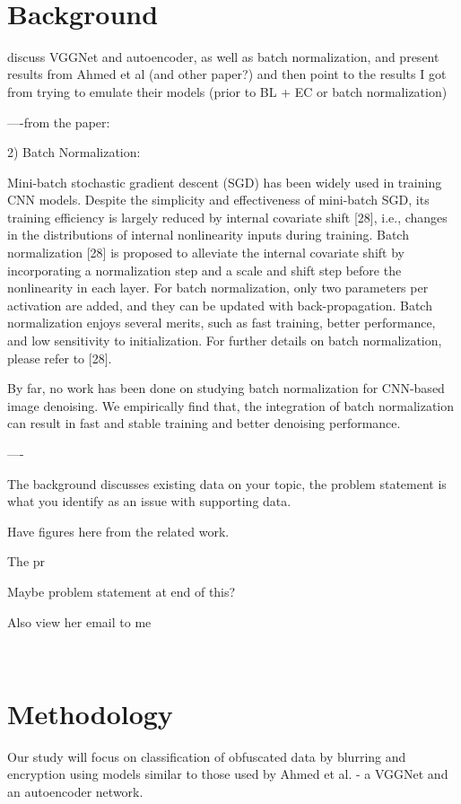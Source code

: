 \documentclass[12pt, titlepage]{article}
\begin{document}
~\newpage
\section{Background}\label{Background}

discuss VGGNet and autoencoder, as well as batch normalization, and present results from Ahmed et al (and other paper?) and then point to the results I got from trying to emulate their models (prior to BL + EC or batch normalization)

----from the paper:


2) Batch Normalization:

Mini-batch stochastic gradient descent (SGD) has been widely used in training CNN models. Despite the simplicity and effectiveness of mini-batch SGD, its training efficiency is largely reduced by internal covariate shift [28], i.e., changes in the distributions of internal nonlinearity inputs during training. Batch normalization [28] is proposed to alleviate the internal covariate shift by incorporating a normalization step and a scale and shift step before the nonlinearity in each layer. For batch normalization, only two parameters per activation are added, and they can be updated with back-propagation. Batch normalization enjoys several merits, such as fast training, better performance, and low sensitivity to initialization. For further details on batch normalization, please refer to [28].

By far, no work has been done on studying batch normalization for CNN-based image denoising. We empirically find that, the integration of batch normalization can result in fast and stable training and better denoising performance.

----



The background discusses existing data on your topic, the problem statement is what you identify as an issue with supporting data. 

Have figures here from the related work.

The pr



Maybe problem statement at end of this?

Also view her email to me

~\newpage
\section{Methodology}

Our study will focus on classification of obfuscated data by blurring and encryption using models similar to those used by Ahmed et al. - a VGGNet and an autoencoder network.
\end{document}
